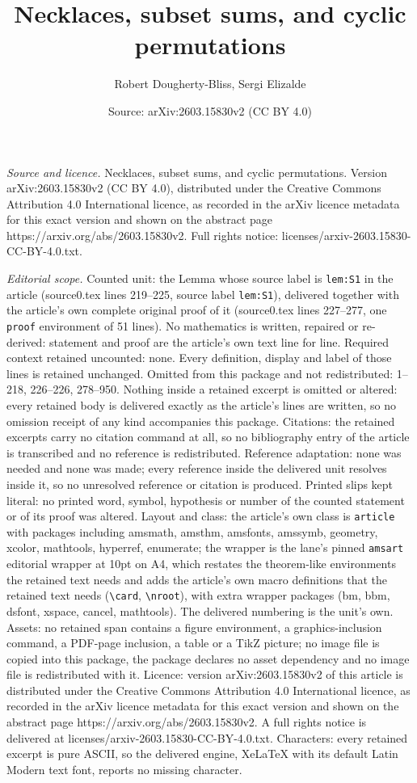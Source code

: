 \documentclass[10pt,a4paper]{amsart}
\title[Necklaces, subset sums, and cyclic permutations]{Necklaces, subset sums, and cyclic permutations}
\author{Robert Dougherty-Bliss, Sergi Elizalde}
\date{Source: arXiv:2603.15830v2 (CC BY 4.0)}
\begin{document}
\maketitle

\noindent\emph{Source and licence.} Necklaces, subset sums, and cyclic permutations. Version arXiv:2603.15830v2 (CC BY 4.0), distributed under the Creative Commons Attribution 4.0 International licence, as recorded in the arXiv licence metadata for this exact version and shown on the abstract page https://arxiv.org/abs/2603.15830v2. Full rights notice: licenses/arxiv-2603.15830-CC-BY-4.0.txt.\par\smallskip

\noindent\textit{Editorial scope.} Counted unit: the Lemma whose source label is \texttt{lem:S1} in the article (source0.tex lines 219--225, source label \texttt{lem:S1}), delivered together with the article's own complete original proof of it (source0.tex lines 227--277, one \texttt{proof} environment of 51 lines). No mathematics is written, repaired or re-derived: statement and proof are the article's own text line for line. Required context retained uncounted: none. Every definition, display and label of those lines is retained unchanged. Omitted from this package and not redistributed: 1--218, 226--226, 278--950. Nothing inside a retained excerpt is omitted or altered: every retained body is delivered exactly as the article's lines are written, so no omission receipt of any kind accompanies this package. Citations: the retained excerpts carry no citation command at all, so no bibliography entry of the article is transcribed and no reference is redistributed. Reference adaptation: none was needed and none was made; every reference inside the delivered unit resolves inside it, so no unresolved reference or citation is produced. Printed slips kept literal: no printed word, symbol, hypothesis or number of the counted statement or of its proof was altered. Layout and class: the article's own class is \texttt{article} with packages including amsmath, amsthm, amsfonts, amssymb, geometry, xcolor, mathtools, hyperref, enumerate; the wrapper is the lane's pinned \texttt{amsart} editorial wrapper at 10pt on A4, which restates the theorem-like environments the retained text needs and adds the article's own macro definitions that the retained text needs (\texttt{\textbackslash card}, \texttt{\textbackslash nroot}), with extra wrapper packages (bm, bbm, dsfont, xspace, cancel, mathtools). The delivered numbering is the unit's own. Assets: no retained span contains a figure environment, a graphics-inclusion command, a PDF-page inclusion, a table or a TikZ picture; no image file is copied into this package, the package declares no asset dependency and no image file is redistributed with it. Licence: version arXiv:2603.15830v2 of this article is distributed under the Creative Commons Attribution 4.0 International licence, as recorded in the arXiv licence metadata for this exact version and shown on the abstract page https://arxiv.org/abs/2603.15830v2. A full rights notice is delivered at licenses/arxiv-2603.15830-CC-BY-4.0.txt. Characters: every retained excerpt is pure ASCII, so the delivered engine, XeLaTeX with its default Latin Modern text font, reports no missing character.
\end{document}
